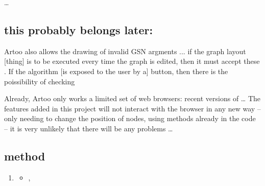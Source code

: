 \ldots

\subsection{this probably belongs later:}

Artoo also allows the drawing of invalid GSN argments ...
if the graph layout [thing] is to be executed every time the graph is edited, then it must accept these .
If the algorithm [is exposed to the user by a] button, then there is the poissibility of checking 

Already, Artoo only works a limited set of web browsers: recent versions of \ldots
The features added in this project will not interact with the browser in any new way -- only needing to change the position of nodes, using methods already in the code -- it is very unlikely that there will be any problems \ldots

\subsection{method}


  \begin{enumerate}
    \item
      \begin{itemize}
      \item ,
    \end{itemize}
  \end{enumerate}
